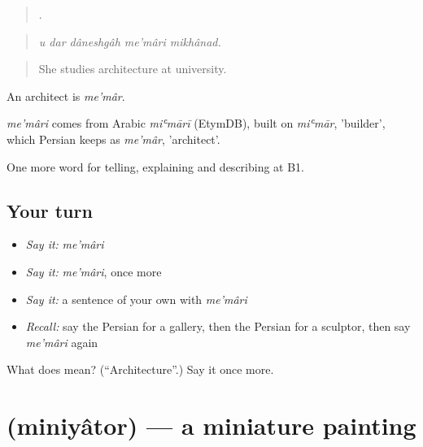 \begin{quote}
    .
\end{quote}

\begin{quote}
\emph{u dar dâneshgâh me'mâri mikhânad.}
\end{quote}

\begin{quote}
She studies architecture at university.
\end{quote}

An architect is \emph{me'mâr}.

\begin{cousinweb}
\emph{me'mâri} comes from Arabic \emph{miʿmārī} (EtymDB), built on \emph{miʿmār}, 'builder', which Persian keeps as \emph{me'mâr}, 'architect'.
\end{cousinweb}

\begin{grammarlens}[title={What you've built}]
One more word for telling, explaining and describing at B1.
\end{grammarlens}

\subsection*{Your turn}
\begin{itemize}
\raggedright
  \item \emph{Say it:} \emph{me'mâri}
  \item \emph{Say it:} \emph{me'mâri}, once more
  \item \emph{Say it:} a sentence of your own with \emph{me'mâri}
  \item \emph{Recall:} say the Persian for a gallery, then the Persian for a sculptor, then say \emph{me'mâri} again
\end{itemize}

\begin{tcolorbox}[breakable,colback=teal!4,colframe=teal!35!black,title={Before you move on}]
What does  mean? (\textquotedblleft{}Architecture\textquotedblright{}.) Say it once more.
\end{tcolorbox}
\section[\texorpdfstring{\fa{مینیاتور} (miniyâtor)}{مینیاتور (miniyâtor)}]{ (miniyâtor) — a miniature painting}

\label{lesson:FA-C526-miniyator}



